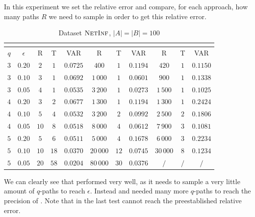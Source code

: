 In this experiment we set the relative error and compare, for each approach, how many paths $R$ we need to sample in order to get this relative error.\medskip

\begin{table}[h]
	\centering
	\begin{tabular}{|c|c|c|c|c|c|c|c|c|c|c|}
		\cline{3-11}
		\multicolumn{2}{c|}{} & \multicolumn{3}{c|}{\fcount} & \multicolumn{3}{c|}{\fsamp} & \multicolumn{3}{c|}{\base}\\
		\hline	
		$q$ & $\epsilon$ & R    & T    & VAR      & R         & T    & VAR      & R         & T   & VAR      \\ \hline
		$3$ & $0.20$     & $2$  & $1$  & $0.0725$ & $400$     & $1$  & $0.1194$ & $420$     & $1$ & $0.1150$ \\ \hline
		$3$ & $0.10$     & $3$  & $1$  & $0.0692$ & $1\,000$  & $1$  & $0.0601$ & $900$     & $1$ & $0.1338$ \\ \hline
		$3$ & $0.05$     & $4$  & $1$  & $0.0535$ & $3\,200$  & $1$  & $0.0273$ & $1\,500$  & $1$ & $0.1025$ \\ \hline
		\hline
		$4$ & $0.20$     & $3$  & $2$  & $0.0677$ & $1\,300$  & $1$  & $0.1194$ & $1\,300$  & $1$ & $0.2424$ \\ \hline
		$4$ & $0.10$     & $5$  & $4$  & $0.0532$ & $3\,200$  & $2$  & $0.0992$ & $2\,500$  & $2$ & $0.1806$ \\ \hline
		$4$ & $0.05$     & $10$ & $8$  & $0.0518$ & $8\,000$  & $4$  & $0.0612$ & $7\,900$  & $3$ & $0.1081$ \\ \hline
		\hline
		$5$ & $0.20$     & $5$  & $6$  & $0.0511$ & $5\,000$  & $4$  & $0.1678$ & $6\,000$  & $3$ & $0.2234$ \\ \hline
		$5$ & $0.10$     & $10$ & $18$ & $0.0370$ & $20\,000$ & $12$ & $0.0745$ & $30\,000$ & $8$ & $0.1234$ \\ \hline
		$5$ & $0.05$     & $20$ & $58$ & $0.0204$ & $80\,000$ & $30$ & $0.0376$ & $/$       & $/$ & $/$      \\ \hline
	\end{tabular}
	\caption{Dataset $\textsc{NetInf}$, $|A| = |B| = 100$}
\end{table}
\medskip

We can clearly see that \fcount performed very well, as it needs to sample a very little amount of $q$-paths to reach $\epsilon$.
Instead \fsamp and \base needed many more $q$-paths to reach the precision of \fcount. Note that in the last test \base cannot reach the preestablished relative error.\bigskip

